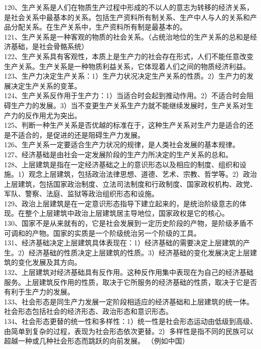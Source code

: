 \documentclass[a4paper,fleqn]{article}
\begin{document}
120、生产关系是人们在物质生产过程中形成的不以人的意志为转移的经济关系，是社会关系中最基本的关系。包括生产资料所有制关系、生产中人与人的关系和产品分配关系。在生产关系中，生产资料所有制是最基本的。 \\
121、生产关系是一种客观的物质的社会关系。（占统治地位的生产关系的总和是经济基础，是社会骨骼系统） \\
122、生产关系具有客观性，本质上是生产力的社会存在形式，人们不能任意改变生产关系。生产关系是一种物质利益关系，它体现着人们之间的物质经济利益。 \\
123、生产力决定生产关系：1）生产力状况决定生产关系的性质。2）生产力的发展决定生产关系的变革。 \\
124、生产关系反作用于生产力：1）当适合时会起到推动作用。2）不适合时会阻碍生产力的发展。3）当不变更生产关系生产力就不能继续发展时，生产关系对生产力的反作用尤为突出。 \\
125、判断一种生产关系是否优越的标准在于，这种生产关系对生产力是适合的还是不适合的，是促进的还是阻碍生产力发展。 \\
126、生产关系一定要适合生产力状况的规律，是人类社会发展的基本规律。 \\
127、经济基础是由社会一定发展阶段的生产力所决定的生产关系的总和。 \\
128、上层建筑是指在一定经济基础之上的意识形态以及相应的制度、组织和设施。1）观念上层建筑，包括政治法律思想、道德、艺术、宗教、哲学等。2）政治上层建筑，包括国家政治制度、立法司法制度和行政制度、国家政权机构、政党、军队、警察、法庭、监狱等政治组织形态和设施。 \\
129、政治上层建筑是在一定意识形态指导下建立起来的，是统治阶级意志的体现。在整个上层建筑中政治上层建筑居主导地位，国家政权是它的核心。 \\
130、国家不是从来就有的，它是社会发展到一定历史阶段的产物，是阶级矛盾不可调和的产物。国家的实质是一个阶级统治另一个阶级的工具。 \\
131、经济基础决定上层建筑具体表现在：1）经济基础的需要决定上层建筑的产生。2）经济基础的性质决定上层建筑的性质。3）经济基础的变化发展决定上层建筑的变化发展及其方向。 \\
132、上层建筑对经济基础具有反作用。这种反作用集中表现在为自己的经济基础服务。上层建筑反作用的性质，取决于它所服务的经济基础的性质，取决于它是否有利于生产力的发展。 \\
133、社会形态是同生产力发展一定阶段相适应的经济基础和上层建筑的统一体。社会形态包括社会的经济形态、政治形态和意识形态。 \\
134、社会形态更替的统一性和多样性：1）统一性是社会形态运动由低级到高级、由简单到复杂的过程，表现为社会形态依次更替。2）多样性是指不同的民族可以超越一种或几种社会形态而跳跃的向前发展。 （例如中国） \\
\end{document}
